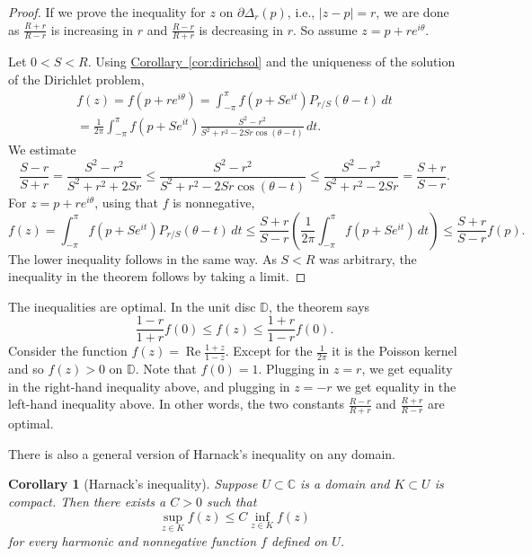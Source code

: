 \documentclass[12pt,openany]{book}
\renewcommand{\Re}{\operatorname{Re}}
\newcommand{\sabs}[1]{\lvert {#1} \rvert}
\newcommand{\C}{{\mathbb{C}}}
\newcommand{\D}{{\mathbb{D}}}
\theoremstyle{plain}
\newtheorem{cor}[thm]{Corollary}
\theoremstyle{remark}
\theoremstyle{definition}
\theoremstyle{exercise}
\theoremstyle{example}
\newcommand{\corref}[1]{\hyperref[#1]{Corollary~\ref*{#1}}}
\begin{document}
\begin{proof}
If we prove the inequality for $z$ on 
$\partial \Delta_r(p)$, i.e., $\sabs{z-p}=r$, we are done
as $\frac{R+r}{R-r}$ is increasing in $r$ and
$\frac{R-r}{R+r}$ is decreasing in $r$.  So 
assume $z = p+re^{i\theta}$.

Let $0 < S < R$.  Using \corref{cor:dirichsol} and the uniqueness of the
solution of the
Dirichlet problem,
\begin{multline*}
f(z)
=
f(p + re^{i\theta})
=
\int_{-\pi}^\pi f(p+Se^{it}) P_{r/S}(\theta-t) \, dt
\\
=
\frac{1}{2\pi} 
\int_{-\pi}^\pi f(p+Se^{it})
\frac{S^2-r^2}{S^2+r^2-2Sr \cos (\theta-t)}
\, dt .
\end{multline*}
We estimate
\begin{equation*}
\frac{S-r}{S+r}
=
\frac{S^2-r^2}{S^2+r^2+2Sr}
\leq
\frac{S^2-r^2}{S^2+r^2-2Sr \cos (\theta-t)}
\leq
\frac{S^2-r^2}{S^2+r^2-2Sr}
=
\frac{S+r}{S-r} .
\end{equation*}
For $z = p+re^{i\theta}$,
using that $f$ is nonnegative,
\begin{equation*}
f(z)
=
\int_{-\pi}^\pi f(p+Se^{it}) P_{r/S}(\theta-t) \, dt
\leq
\frac{S+r}{S-r} 
\left(
\frac{1}{2\pi}
\int_{-\pi}^\pi f(p+Se^{it}) \, dt
\right)
\leq
\frac{S+r}{S-r} 
f(p) .
\end{equation*}
The lower inequality follows in the same way.
As $S<R$ was arbitrary, the inequality in the theorem 
follows by taking a limit.
\end{proof}

The inequalities are optimal.  In the unit disc $\D$, the theorem says
\begin{equation*}
\frac{1-r}{1+r} f(0) \leq f(z) \leq \frac{1+r}{1-r} f(0) .
\end{equation*}
Consider the function $f(z) = \Re \frac{1+z}{1-z}$.  Except for the
$\frac{1}{2\pi}$ it is the Poisson kernel and so 
$f(z) > 0$ on $\D$.  Note that $f(0)=1$.  Plugging in $z=r$, we get
equality in the right-hand inequality above, and plugging in $z=-r$
we get equality in the left-hand inequality above.  In other words,
the two constants
$\frac{R-r}{R+r}$ and $\frac{R+r}{R-r}$ are optimal.

There is also a general version of Harnack's inequality on any domain.

\begin{cor}[Harnack's inequality]
Suppose $U \subset \C$ is a domain and $K \subset U$ is compact.
Then there exists a $C > 0$ such that
\begin{equation*}
\sup_{z \in K} f(z) \leq C \inf_{z\in K} f(z)
\end{equation*}
for every harmonic and nonnegative function $f$ defined on $U$.
\end{cor}
\end{document}
